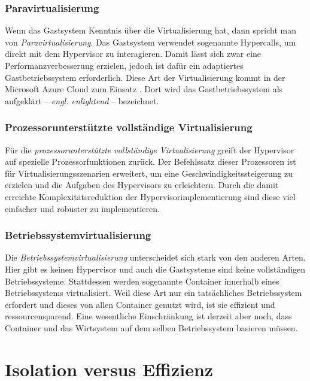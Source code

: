 \subsubsection{Paravirtualisierung}

Wenn das Gastsystem Kenntnis über die Virtualisierung hat, dann spricht man von \textit{Paravirtualisierung}. Das Gastsystem verwendet sogenannte Hypercalls, um direkt mit dem Hypervisor zu interagieren. Damit lässt sich zwar eine Performanzverbesserung erzielen, jedoch ist dafür ein adaptiertes Gastbetriebssystem erforderlich. Diese Art der Virtualisierung kommt \zB in der Microsoft Azure Cloud zum Einsatz \cite[30]{Krishnan10}. Dort wird das Gastbetriebssystem als aufgeklärt -- \textit{engl. enlightend} -- bezeichnet.

\subsubsection{Prozessorunterstützte vollständige Virtualisierung}

Für die \textit{prozessorunterstützte vollständige Virtualisierung} greift der Hypervisor auf spezielle Prozessorfunktionen zurück. Der Befehlssatz dieser Prozessoren ist für Virtualisierungsszenarien erweitert, um eine Geschwindigkeitssteigerung zu erzielen und die Aufgaben des Hypervisors zu erleichtern. Durch die damit erreichte Komplexitätsreduktion der Hypervisorimplementierung sind diese viel einfacher und robuster zu implementieren.

\subsubsection{Betriebssystemvirtualisierung}

Die \textit{Betriebssystemvirtualisierung} unterscheidet sich stark von den anderen Arten. Hier gibt es keinen Hypervisor und auch die Gastsysteme sind keine vollständigen Betriebssysteme. Stattdessen werden sogenannte Container innerhalb eines Betriebssystems virtualisiert. Weil diese Art nur ein tatsächliches Betriebssystem erfordert und dieses von allen Container genutzt wird, ist sie effizient und ressourcensparend. Eine wesentliche Einschränkung ist derzeit aber noch, dass Container und das Wirtsystem auf dem selben Betriebssystem basieren müssen.

\section{Isolation versus Effizienz}
\label{sec:isolation-vs-efficiencys}

